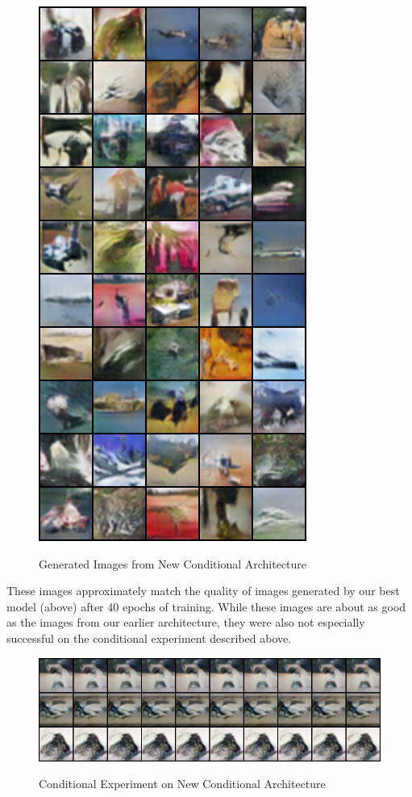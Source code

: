 \documentclass[a4paper]{article}
\begin{document}
\begin{figure}[H]
  \includegraphics[scale=0.5]{images/LARGE_EMBEDDING_10x5_generated.png}
  \label{fig:boat1}
  \caption{Generated Images from New Conditional Architecture}
\end{figure}
These images approximately match the quality of images generated by our best model (above) after 40 epochs of training. While these images are about as good as the images from our earlier architecture, they were also not especially successful on the conditional experiment described above.
\begin{figure}[H]
  \includegraphics[scale=0.5]{images/LARGE_EMBEDDING_fixed_noise_conditional_fake.png}
  \label{fig:boat1}
  \caption{Conditional Experiment on New Conditional Architecture}
\end{figure}
\end{document}
